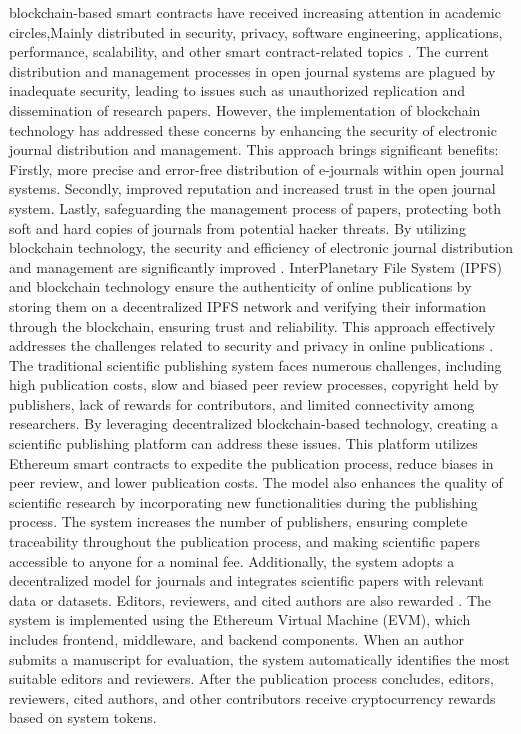 \documentclass[lettersize,journal]{IEEEtran}
\begin{document}
blockchain-based smart contracts have received increasing attention in academic circles,Mainly distributed in security, privacy, software engineering, applications, performance, scalability, and other smart contract-related topics \cite{8756390}. 
The current distribution and management processes in open journal systems are plagued by inadequate security, leading to issues such as unauthorized replication and dissemination of research papers. However, the implementation of blockchain technology has addressed these concerns by enhancing the security of electronic journal distribution and management. This approach brings significant benefits: Firstly, more precise and error-free distribution of e-journals within open journal systems. Secondly, improved reputation and increased trust in the open journal system. Lastly, safeguarding the management process of papers, protecting both soft and hard copies of journals from potential hacker threats. By utilizing blockchain technology, the security and efficiency of electronic journal distribution and management are significantly improved \cite{agustin2020blockchain}.
InterPlanetary File System (IPFS) and blockchain technology ensure the authenticity of online publications by storing them on a decentralized IPFS network and verifying their information through the blockchain, ensuring trust and reliability. This approach effectively addresses the challenges related to security and privacy in online publications \cite{nizamuddin2018ipfs}.
The traditional scientific publishing system faces numerous challenges, including high publication costs, slow and biased peer review processes, copyright held by publishers, lack of rewards for contributors, and limited connectivity among researchers. By leveraging decentralized blockchain-based technology, creating a scientific publishing platform can address these issues. This platform utilizes Ethereum smart contracts to expedite the publication process, reduce biases in peer review, and lower publication costs. The model also enhances the quality of scientific research by incorporating new functionalities during the publishing process. The system increases the number of publishers, ensuring complete traceability throughout the publication process, and making scientific papers accessible to anyone for a nominal fee. Additionally, the system adopts a decentralized model for journals and integrates scientific papers with relevant data or datasets. Editors, reviewers, and cited authors are also rewarded \cite{becstacs2023novel}. The system is implemented using the Ethereum Virtual Machine (EVM), which includes frontend, middleware, and backend components. When an author submits a manuscript for evaluation, the system automatically identifies the most suitable editors and reviewers. After the publication process concludes, editors, reviewers, cited authors, and other contributors receive cryptocurrency rewards based on system tokens.
\end{document}

